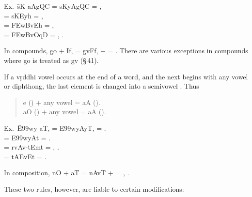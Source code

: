 \begin{tabbing}
  Ex.\ \={\dn sK\? aAgQC} = {\dn sKyAgQC}  =
  , \\
   = {\dn sKEyh}  = ,
  \\
   = {\dn \3FEwBv\?Eh}  = ,
  \\
   = {\dn \3FEwBvOqD\2}  =
  , .
\end{tabbing}

In compounds, {\dn go} + {\dn If,} = {\dn gvFf,}  +  =
. There are various exceptions in compounds where {\dn go}
 is treated as {\dn gv}  (\S\,41).

\s If a vṛddhi vowel occurs at the end of a word, and the next begins
with any vowel or diphthong, the last element is changed into a
semivowel . Thus

\begin{quote}
  {\dn e\?} () + any vowel = {\dn aA} ().\\
  {\dn aO} () + any vowel = {\dn aA} ().\\
\end{quote}

\begin{tabbing}
  Ex.\ \={\dn E\399wy\4 aT\0,} = {\dn E\399wyAyT\0,}  =
  .\\
   = {\dn E\399wyAt\?}  = .\\
   = {\dn rvAv-tEmt\?}  =
  , .\\
   = {\dn tAEvEt}  = .
\end{tabbing}

In composition, {\dn nO} + {\dn aT{\rdt}} = {\dn nAvT{\rdt}}  + 
= , .

\s These two rules, however, are liable to certain modifications:

